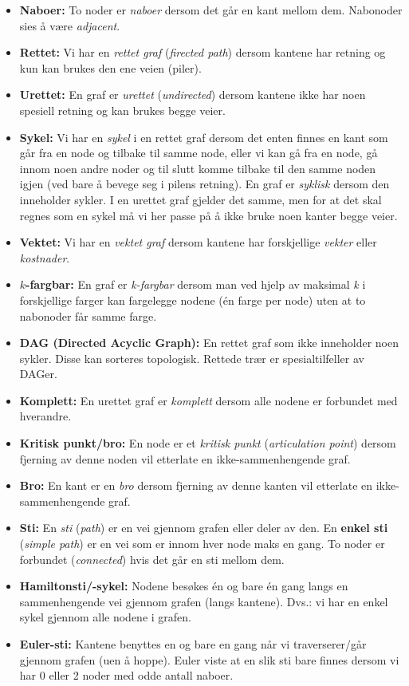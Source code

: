 \begin{itemize}
    \item \textbf{Naboer:} To noder er \textit{naboer} dersom det går en kant mellom dem. Nabonoder sies å være \textit{adjacent}.
    \item \textbf{Rettet:} Vi har en \textit{rettet graf} (\textit{firected path}) dersom kantene har retning og kun kan brukes den ene veien (piler).
    \item \textbf{Urettet:} En graf er \textit{urettet} (\textit{undirected}) dersom kantene ikke har noen spesiell retning og kan brukes begge veier.
    \item \textbf{Sykel:} Vi har en \textit{sykel} i en rettet graf dersom det enten finnes en kant som går fra en node og tilbake til samme node, eller vi kan gå fra en node, gå innom noen andre noder og til slutt komme tilbake til den samme noden igjen (ved bare å bevege seg i pilens retning). En graf er \textit{syklisk} dersom den inneholder sykler. I en urettet graf gjelder det samme, men for at det skal regnes som en sykel må vi her passe på å ikke bruke noen kanter begge veier.
    \item \textbf{Vektet:} Vi har en \textit{vektet graf} dersom kantene har forskjellige \textit{vekter} eller \textit{kostnader}. 
    \item \textbf{$k$-fargbar:} En graf er \textit{k-fargbar} dersom man ved hjelp av maksimal \textit{k} i forskjellige farger kan fargelegge nodene (én farge per node) uten at to nabonoder får samme farge.
    \item \textbf{DAG (Directed Acyclic Graph):} En rettet graf som ikke inneholder noen sykler. Disse kan sorteres topologisk. Rettede trær er spesialtilfeller av DAGer.
    \item \textbf{Komplett:} En urettet graf er \textit{komplett} dersom alle nodene er forbundet med hverandre.
    \item \textbf{Kritisk punkt/bro:} En node er et \textit{kritisk punkt} (\textit{articulation point}) dersom fjerning av denne noden vil etterlate en ikke-sammenhengende graf.
    \item \textbf{Bro:} En kant er en \textit{bro} dersom fjerning av denne kanten vil etterlate en ikke-sammenhengende graf.
    \item \textbf{Sti:} En \textit{sti} (\textit{path}) er en vei gjennom grafen eller deler av den. En \textbf{enkel sti} (\textit{simple path}) er en vei som er innom hver node maks en gang. To noder er forbundet (\textit{connected}) hvis det går en sti mellom dem.
    \item \textbf{Hamiltonsti/-sykel:} Nodene besøkes én og bare én gang langs en sammenhengende vei gjennom grafen (langs kantene). Dvs.: vi har en enkel sykel gjennom alle nodene i grafen.
    \item \textbf{Euler-sti:} Kantene benyttes en og bare en gang når vi traverserer/går gjennom grafen (uen å hoppe). Euler viste at en slik sti bare finnes dersom vi har 0 eller 2 noder med odde antall naboer.
\end{itemize}

